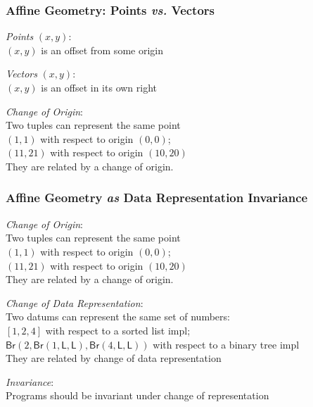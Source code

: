 \documentclass[xetex,serif,mathserif]{beamer}
\newenvironment{slide}[1]{\begin{frame}\frametitle{#1}}{\end{frame}}
\begin{document}
\begin{slide}{Affine Geometry: Points \emph{vs.} Vectors}
  \textcolor{titlered}{\emph{Points}} $(x,y)$:\\
  \quad $(x,y)$ is an offset from some origin

  \medskip

  \textcolor{titlered}{\emph{Vectors}} $(x,y)$:\\
  \quad $(x,y)$ is an offset in its own right

  \hspace{1cm}
  \pause
  
  \textcolor{titlered}{\emph{Change of Origin}}: \\
  \quad Two tuples can represent the same point \\
  \quad\quad $(1,1)$ with respect to origin $(0,0)$; \\
  \quad\quad $(11,21)$ with respect to origin $(10,20)$ \\
  \medskip
  \quad They are related by a change of origin.

\end{slide}

\begin{slide}{Affine Geometry \emph{as} Data Representation Invariance}
  \textcolor{titlered}{\emph{Change of Origin}}: \\
  \quad Two tuples can represent the same point \\
  \quad\quad $(1,1)$ with respect to origin $(0,0)$; \\
  \quad\quad $(11,21)$ with respect to origin $(10,20)$ \\
  \medskip
  \quad They are related by a change of origin.

  \bigskip
  \pause

  \textcolor{titlered}{\emph{Change of Data Representation}}: \\
  \quad Two datums can represent the same set of numbers: \\
  \quad\quad $[1,2,4]$ with respect to a sorted list impl; \\
  \quad\quad $\mathsf{Br}(2, \mathsf{Br}(1,\mathsf{L},\mathsf{L}), \mathsf{Br}(4,\mathsf{L},\mathsf{L}))$ with respect to a binary tree impl\\
  \medskip
  \quad They are related by change of data representation

  \bigskip
  \pause
  \textcolor{titlered}{\emph{Invariance}}: \\
  \quad Programs should be invariant under change of representation
\end{slide}
\end{document}

